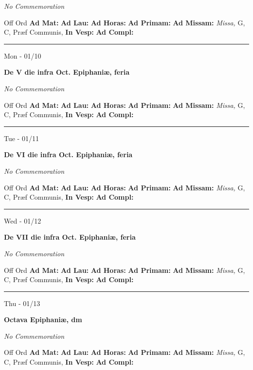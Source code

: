 \documentclass[letterpaper, 10pt]{article}
\begin{document}
\textit{No Commemoration}\begin{justify}
Off Ord
\textbf{Ad Mat: }
\textbf{Ad Lau: }
\textbf{Ad Horas: }
\textbf{Ad Primam: }
\textbf{Ad Missam:} \textit{Missa, } G, C, Præf Communis, 
\textbf{In Vesp: }
\textbf{Ad Compl: }\end{justify}



\hrule
\begin{center}
Mon - 01/10
\end{center}\textbf{ \large De V die infra Oct. Epiphaniæ, \textnormal{\normalsize feria}}

\textit{No Commemoration}\begin{justify}
Off Ord
\textbf{Ad Mat: }
\textbf{Ad Lau: }
\textbf{Ad Horas: }
\textbf{Ad Primam: }
\textbf{Ad Missam:} \textit{Missa, } G, C, Præf Communis, 
\textbf{In Vesp: }
\textbf{Ad Compl: }\end{justify}



\hrule
\begin{center}
Tue - 01/11
\end{center}\textbf{ \large De VI die infra Oct. Epiphaniæ, \textnormal{\normalsize feria}}

\textit{No Commemoration}\begin{justify}
Off Ord
\textbf{Ad Mat: }
\textbf{Ad Lau: }
\textbf{Ad Horas: }
\textbf{Ad Primam: }
\textbf{Ad Missam:} \textit{Missa, } G, C, Præf Communis, 
\textbf{In Vesp: }
\textbf{Ad Compl: }\end{justify}



\hrule
\begin{center}
Wed - 01/12
\end{center}\textbf{ \large De VII die infra Oct. Epiphaniæ, \textnormal{\normalsize feria}}

\textit{No Commemoration}\begin{justify}
Off Ord
\textbf{Ad Mat: }
\textbf{Ad Lau: }
\textbf{Ad Horas: }
\textbf{Ad Primam: }
\textbf{Ad Missam:} \textit{Missa, } G, C, Præf Communis, 
\textbf{In Vesp: }
\textbf{Ad Compl: }\end{justify}



\hrule
\begin{center}
Thu - 01/13
\end{center}\textbf{ \large Octava Epiphaniæ, \textnormal{\normalsize dm}}

\textit{No Commemoration}\begin{justify}
Off Ord
\textbf{Ad Mat: }
\textbf{Ad Lau: }
\textbf{Ad Horas: }
\textbf{Ad Primam: }
\textbf{Ad Missam:} \textit{Missa, } G, C, Præf Communis, 
\textbf{In Vesp: }
\textbf{Ad Compl: }\end{justify}
\end{document}
